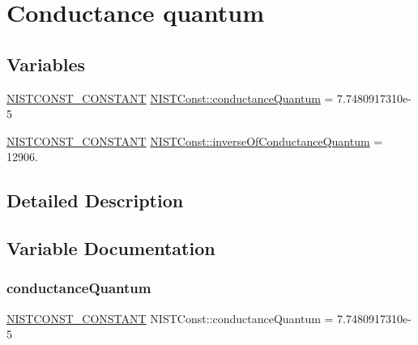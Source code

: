 \hypertarget{group___n_i_s_t_const-_conductance_quantum}{}\section{Conductance quantum}
\label{group___n_i_s_t_const-_conductance_quantum}
\subsection*{Variables}
\begin{DoxyCompactItemize}
\item 
\mbox{\hyperlink{group___n_i_s_t_const-_macros_ga2b0fc1d7452373f816175dd86ce26729}{N\+I\+S\+T\+C\+O\+N\+S\+T\+\_\+\+C\+O\+N\+S\+T\+A\+NT}} \mbox{\hyperlink{group___n_i_s_t_const-_conductance_quantum_ga134ad3777be531b9ba1313ef94a6885f}{N\+I\+S\+T\+Const\+::conductance\+Quantum}} = 7.\+7480917310e-\/5
\item 
\mbox{\hyperlink{group___n_i_s_t_const-_macros_ga2b0fc1d7452373f816175dd86ce26729}{N\+I\+S\+T\+C\+O\+N\+S\+T\+\_\+\+C\+O\+N\+S\+T\+A\+NT}} \mbox{\hyperlink{group___n_i_s_t_const-_conductance_quantum_ga629e01b406bd14e35a1de57795ac3a75}{N\+I\+S\+T\+Const\+::inverse\+Of\+Conductance\+Quantum}} = 12906.
\end{DoxyCompactItemize}


\subsection{Detailed Description}


\subsection{Variable Documentation}
\mbox{\label{group___n_i_s_t_const-_conductance_quantum_ga134ad3777be531b9ba1313ef94a6885f}} 
\subsubsection{\texorpdfstring{conductance\+Quantum}{conductanceQuantum}}
{\footnotesize\ttfamily \mbox{\hyperlink{group___n_i_s_t_const-_macros_ga2b0fc1d7452373f816175dd86ce26729}{N\+I\+S\+T\+C\+O\+N\+S\+T\+\_\+\+C\+O\+N\+S\+T\+A\+NT}} N\+I\+S\+T\+Const\+::conductance\+Quantum = 7.\+7480917310e-\/5}

